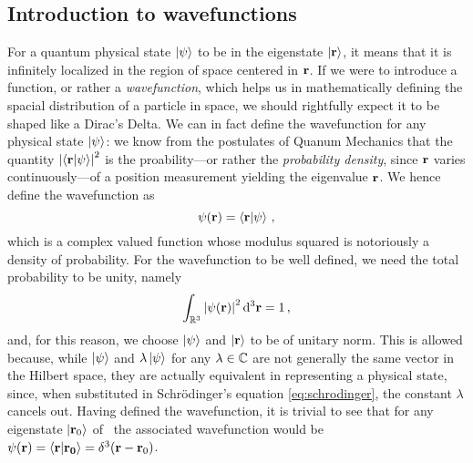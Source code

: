         \subsection{Introduction to wavefunctions}
            For a quantum physical state $\ket{\psi}$ to be in the eigenstate $\ket{\vb{r}}$, it means that it is infinitely localized in the region of space centered in $\vb{r}$. If we were to introduce a function, or rather a \emph{wavefunction}, which helps us in mathematically defining the spacial distribution of a particle in space, we should rightfully expect it to be shaped like a Dirac's Delta. We can in fact define the wavefunction for any physical state $\ket{\psi}$: we know from the postulates of Quanum Mechanics that the quantity $\abs{\braket{\vb{r}}{\psi}}^2$ is the proability---or rather the \emph{probability density}, since $\vb{r}$ varies continuously---of a position measurement yielding the eigenvalue $\vb{r}$. We hence define the wavefunction as
            \begin{equation}
                \label{eq:vavefunction}
                \psi\pqty{\vb{r}} = \braket{\vb{r}}{\psi}
                \mycomma
            \end{equation}
            which is a complex valued function whose modulus squared is notoriously a density of probability. For the wavefunction to be well defined, we need the total probability to be unity, namely 
            \begin{equation}
                \label{eq:normalization}
                \int\nolimits_{\bbR^3}\abs{\psi\pqty{\vb{r}}}^2 \dd[3]{\vb{r}} = 1
                \mycomma
            \end{equation}
            and, for this reason, we choose $\ket{\psi}$ and $\ket{\vb{r}}$ to be of unitary norm. This is allowed because, while $\ket{\psi}$ and $\lambda\ket{\psi}$ for any $\lambda\in\mathbb{C}$ are not generally the same vector in the Hilbert space, they are actually equivalent in representing a physical state, since, when substituted in Schr\"odinger's equation \eqref{eq:schrodinger}, the constant $\lambda$ cancels out. %
            Having defined the wavefunction, it is trivial to see that for any eigenstate $\ket{\vb{r}_0}$ of \hvr\ the associated wavefunction would be $\psi\pqty{\vb{r}} = \braket{\vb{r}}{\vb{r_0}} = \delta^3\pqty{\vb{r} - \vb{r}_0}$.

